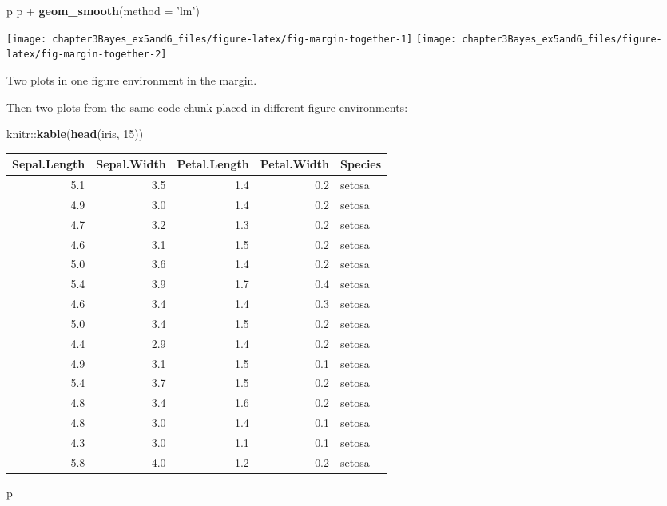 \documentclass[]{tufte-handout}
\newenvironment{Shaded}{}{}
\newcommand{\KeywordTok}[1]{\textcolor[rgb]{0.00,0.44,0.13}{\textbf{{#1}}}}
\newcommand{\DataTypeTok}[1]{\textcolor[rgb]{0.56,0.13,0.00}{{#1}}}
\newcommand{\DecValTok}[1]{\textcolor[rgb]{0.25,0.63,0.44}{{#1}}}
\newcommand{\StringTok}[1]{\textcolor[rgb]{0.25,0.44,0.63}{{#1}}}
\newcommand{\NormalTok}[1]{{#1}}
\begin{document}
\begin{Shaded}
\begin{Highlighting}[]
\NormalTok{p}
\NormalTok{p +}\StringTok{ }\KeywordTok{geom_smooth}\NormalTok{(}\DataTypeTok{method =} \StringTok{'lm'}\NormalTok{)}
\end{Highlighting}
\end{Shaded}

\begin{marginfigure}
\texttt{[image: chapter3Bayes\_ex5and6\_files/figure-latex/fig-margin-together-1]} \texttt{[image: chapter3Bayes\_ex5and6\_files/figure-latex/fig-margin-together-2]} \caption[Two plots in one figure environment in the margin]{Two plots in one figure environment in the margin.}\label{fig:fig-margin-together}
\end{marginfigure}

Then two plots from the same code chunk placed in different figure
environments:

\begin{Shaded}
\begin{Highlighting}[]
\NormalTok{knitr::}\KeywordTok{kable}\NormalTok{(}\KeywordTok{head}\NormalTok{(iris, }\DecValTok{15}\NormalTok{))}
\end{Highlighting}
\end{Shaded}

\begin{longtable}[c]{@{}rrrrl@{}}
\toprule
Sepal.Length & Sepal.Width & Petal.Length & Petal.Width &
Species\tabularnewline
\midrule
\endhead
5.1 & 3.5 & 1.4 & 0.2 & setosa\tabularnewline
4.9 & 3.0 & 1.4 & 0.2 & setosa\tabularnewline
4.7 & 3.2 & 1.3 & 0.2 & setosa\tabularnewline
4.6 & 3.1 & 1.5 & 0.2 & setosa\tabularnewline
5.0 & 3.6 & 1.4 & 0.2 & setosa\tabularnewline
5.4 & 3.9 & 1.7 & 0.4 & setosa\tabularnewline
4.6 & 3.4 & 1.4 & 0.3 & setosa\tabularnewline
5.0 & 3.4 & 1.5 & 0.2 & setosa\tabularnewline
4.4 & 2.9 & 1.4 & 0.2 & setosa\tabularnewline
4.9 & 3.1 & 1.5 & 0.1 & setosa\tabularnewline
5.4 & 3.7 & 1.5 & 0.2 & setosa\tabularnewline
4.8 & 3.4 & 1.6 & 0.2 & setosa\tabularnewline
4.8 & 3.0 & 1.4 & 0.1 & setosa\tabularnewline
4.3 & 3.0 & 1.1 & 0.1 & setosa\tabularnewline
5.8 & 4.0 & 1.2 & 0.2 & setosa\tabularnewline
\bottomrule
\end{longtable}

\begin{Shaded}
\begin{Highlighting}[]
\NormalTok{p}
\end{Highlighting}
\end{Shaded}
\end{document}
